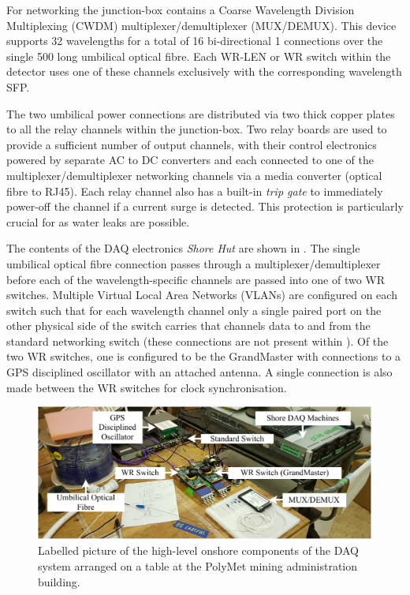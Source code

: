 For networking the junction-box contains a Coarse Wavelength Division Multiplexing (CWDM)
multiplexer/demultiplexer (MUX/DEMUX). This device supports 32 wavelengths for a total of 16
bi-directional \unit{1}{} connections over the single \unit{500}{} long umbilical
optical fibre. Each WR-LEN or WR switch within the detector uses one of these channels exclusively
with the corresponding wavelength SFP.

The two umbilical power connections are distributed via two thick copper plates to all the relay
channels within the junction-box. Two relay boards are used to provide a sufficient number of
output channels, with their control electronics powered by separate AC to DC converters and each
connected to one of the multiplexer/demultiplexer networking channels via a media converter
(optical fibre to RJ45). Each relay channel also has a built-in \emph{trip gate} to immediately
power-off the channel if a current surge is detected. This protection is particularly crucial for
\chipsfive as water leaks are possible.

The contents of the DAQ electronics \emph{Shore Hut} are shown in . The
single umbilical optical fibre connection passes through a multiplexer/demultiplexer before each
of the wavelength-specific channels are passed into one of two WR switches. Multiple Virtual Local
Area Networks (VLANs) are configured on each switch such that for each wavelength channel only a
single paired port on the other physical side of the switch carries that channels data to and from
the standard networking switch (these connections are not present within ).
Of the two WR switches, one is configured to be the GrandMaster with connections to a GPS
disciplined oscillator with an attached antenna. A single connection is also made between the WR
switches for clock synchronisation.

\begin{figure} %
    \includegraphics[width=\textwidth]{diagrams/5-daq/hut_daq.pdf}
    \caption[Labelled picture of the high-level onshore components of the \chipsfive DAQ system]
    {Labelled picture of the high-level onshore components of the \chipsfive DAQ system arranged
        on a table at the PolyMet mining administration building.}
    \label{fig:hut_daq}
\end{figure}

